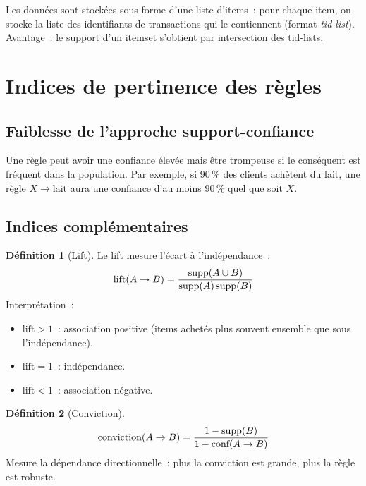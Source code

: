 \documentclass[a4paper,11pt]{article}
\theoremstyle{definition}
\newtheorem*{definition}{D\'efinition}
\theoremstyle{remark}
\begin{document}
Les donn\'ees sont stock\'ees sous forme d'une liste d'items~: pour
chaque item, on stocke la liste des identifiants de transactions
qui le contiennent (format \emph{tid-list}). Avantage~: le support
d'un itemset s'obtient par intersection des tid-lists.

\section{Indices de pertinence des r\`egles}

\subsection{Faiblesse de l'approche support-confiance}

Une r\`egle peut avoir une confiance \'elev\'ee mais \^etre
trompeuse si le cons\'equent est fr\'equent dans la population.
Par exemple, si 90\,\% des clients ach\`etent du lait, une r\`egle
$X \rightarrow \text{lait}$ aura une confiance d'au moins 90\,\%
quel que soit $X$.

\subsection{Indices compl\'ementaires}

\begin{definition}[Lift]
  Le lift mesure l'\'ecart \`a l'ind\'ependance~:
  \begin{equation}
    \text{lift}(A \rightarrow B) = \frac{\text{supp}(A \cup B)}{%
      \text{supp}(A)\,\text{supp}(B)}
  \end{equation}
  Interpr\'etation~:
  \begin{itemize}
    \item $\text{lift} > 1$~: association positive (items achet\'es
      plus souvent ensemble que sous l'ind\'ependance).
    \item $\text{lift} = 1$~: ind\'ependance.
    \item $\text{lift} < 1$~: association n\'egative.
  \end{itemize}
\end{definition}

\begin{definition}[Conviction]
  \begin{equation}
    \text{conviction}(A \rightarrow B) = \frac{1 - \text{supp}(B)}{%
      1 - \text{conf}(A \rightarrow B)}
  \end{equation}
  Mesure la d\'ependance directionnelle~: plus la conviction est
  grande, plus la r\`egle est robuste.
\end{definition}
\end{document}
